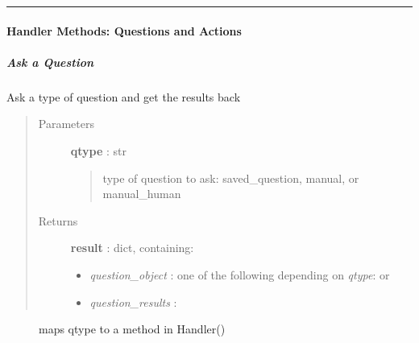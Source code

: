 \documentclass[letterpaper,10pt,english]{sphinxmanual}
\begin{document}
\bigskip\hrule{}\bigskip



\paragraph{Handler Methods: Questions and Actions}
\label{pytan.handler:handler-methods-questions-and-actions}

\subparagraph{Ask a Question}
\label{pytan.handler:ask-a-question}

\begin{fulllineitems}
\label{pytan.handler:pytan.handler.Handler.ask}
Ask a type of question and get the results back
\begin{quote}\begin{description}
\item[{Parameters}] \leavevmode
\textbf{qtype} : str
\begin{quote}

type of question to ask: saved\_question, manual, or manual\_human
\end{quote}

\item[{Returns}] \leavevmode
\textbf{result} : dict, containing:
\begin{itemize}
\item {} 
\emph{question\_object} : one of the following depending on \emph{qtype}: {\hyperref[taniumpy.object_types:taniumpy.object_types.question.Question]{}} or {\hyperref[taniumpy.object_types:taniumpy.object_types.saved_question.SavedQuestion]{}}

\item {} 
\emph{question\_results} : {\hyperref[taniumpy.object_types:taniumpy.object_types.result_set.ResultSet]{}}

\end{itemize}

\end{description}\end{quote}



\begin{description}
\item[{{\hyperref[pytan.constants:pytan.constants.Q_OBJ_MAP]{}}}] \leavevmode
maps qtype to a method in Handler()

\end{description}



\end{fulllineitems}
\end{document}

